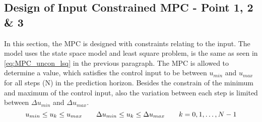 \subsection{Design of Input Constrained MPC - Point 1, 2 \& 3}
\label{sec:in_con_MPC}
In this section, the MPC is designed with constraints relating to the input. The model uses the state space model and least square problem, is the same as seen in \cref{eq:MPC_uncon_lsq} in the previous paragraph. The MPC is allowed to determine a value, which satisfies the control input to be between $u_{min}$ and $u_{max}$ for all steps (N) in the prediction horizon. Besides the constrain of the minimum and maximum of the control input, also the variation between each step is limited between $\Delta u_{min}$ and $\Delta u_{max}$.
\begin{equation}
    u_{min}\leq u_k\leq u_{max} \qquad \Delta u_{min}\leq u_k\leq \Delta u_{max} \qquad k=0,1,\dots ,N-1\\
\end{equation}
